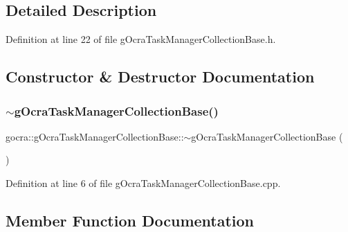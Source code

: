 \subsection{Detailed Description}


Definition at line 22 of file g\+Ocra\+Task\+Manager\+Collection\+Base.\+h.



\subsection{Constructor \& Destructor Documentation}
\hypertarget{classgocra_1_1gOcraTaskManagerCollectionBase_afe4a8d100c2a8aae6263249145a2d941}{}\label{classgocra_1_1gOcraTaskManagerCollectionBase_afe4a8d100c2a8aae6263249145a2d941} 
\subsubsection{\texorpdfstring{$\sim$g\+Ocra\+Task\+Manager\+Collection\+Base()}{~gOcraTaskManagerCollectionBase()}}
{\footnotesize\ttfamily gocra\+::g\+Ocra\+Task\+Manager\+Collection\+Base\+::$\sim$g\+Ocra\+Task\+Manager\+Collection\+Base (\begin{DoxyParamCaption}{ }\end{DoxyParamCaption})\hspace{0.3cm}{\ttfamily [virtual]}}



Definition at line 6 of file g\+Ocra\+Task\+Manager\+Collection\+Base.\+cpp.



\subsection{Member Function Documentation}
\hypertarget{classgocra_1_1gOcraTaskManagerCollectionBase_a81b68fbc3c26897cb4c971bd53199b78}{}\label{classgocra_1_1gOcraTaskManagerCollectionBase_a81b68fbc3c26897cb4c971bd53199b78} 
